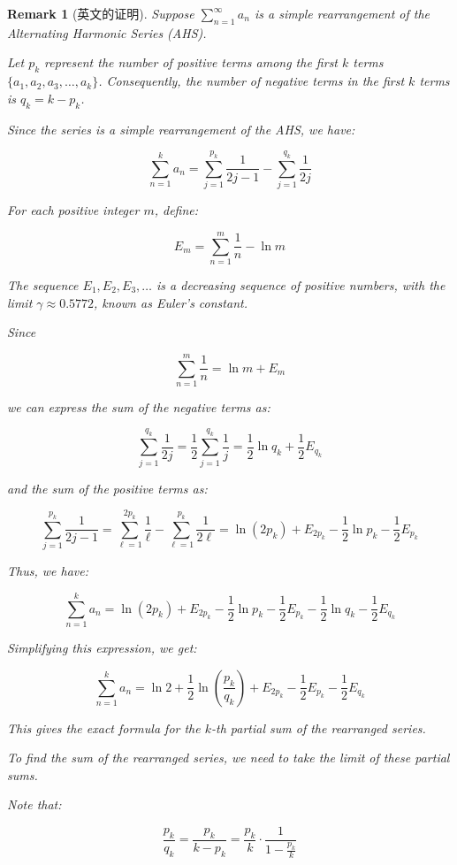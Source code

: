 \documentclass{ctexart}
\newtheorem*{remark}{Remark}
\begin{document}
\begin{remark}[英文的证明]

Suppose \(\sum_{n=1}^{\infty} a_n\) is a simple rearrangement of the Alternating Harmonic Series (AHS).

Let \(p_k\) represent the number of positive terms among the first \(k\) terms \(\{a_1, a_2, a_3, \dots, a_k\}\). Consequently, the number of negative terms in the first \(k\) terms is \(q_k = k - p_k\).

Since the series is a simple rearrangement of the AHS, we have:

\[
\sum_{n=1}^{k} a_n = \sum_{j=1}^{p_k} \frac{1}{2j-1} - \sum_{j=1}^{q_k} \frac{1}{2j}
\]

For each positive integer \(m\), define:

\[
E_m = \sum_{n=1}^{m} \frac{1}{n} - \ln m
\]

The sequence \(E_1, E_2, E_3, \dots\) is a decreasing sequence of positive numbers, with the limit \(\gamma \approx 0.5772\), known as Euler's constant.

Since

\[
\sum_{n=1}^{m} \frac{1}{n} = \ln m + E_m
\]

we can express the sum of the negative terms as:

\[
\sum_{j=1}^{q_k} \frac{1}{2j} = \frac{1}{2} \sum_{j=1}^{q_k} \frac{1}{j} = \frac{1}{2} \ln q_k + \frac{1}{2} E_{q_k}
\]

and the sum of the positive terms as:

\[
\sum_{j=1}^{p_k} \frac{1}{2j-1} = \sum_{\ell=1}^{2p_k} \frac{1}{\ell} - \sum_{\ell=1}^{p_k} \frac{1}{2\ell} = \ln(2p_k) + E_{2p_k} - \frac{1}{2} \ln p_k - \frac{1}{2} E_{p_k}
\]

Thus, we have:

\[
\sum_{n=1}^{k} a_n = \ln(2p_k) + E_{2p_k} - \frac{1}{2} \ln p_k - \frac{1}{2} E_{p_k} - \frac{1}{2} \ln q_k - \frac{1}{2} E_{q_k}
\]

Simplifying this expression, we get:

\[
\sum_{n=1}^{k} a_n = \ln 2 + \frac{1}{2} \ln \left(\frac{p_k}{q_k}\right) + E_{2p_k} - \frac{1}{2} E_{p_k} - \frac{1}{2} E_{q_k}
\]

This gives the exact formula for the \(k\)-th partial sum of the rearranged series.

To find the sum of the rearranged series, we need to take the limit of these partial sums.

Note that:

\[
\frac{p_k}{q_k} = \frac{p_k}{k - p_k} = \frac{p_k}{k} \cdot \frac{1}{1 - \frac{p_k}{k}}
\]


\end{remark}
\end{document}
